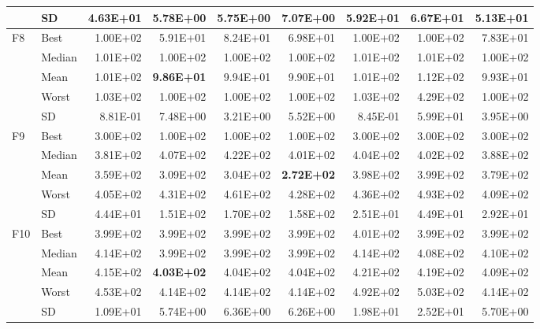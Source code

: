 \documentclass[10pt,a4paper]{article}
\newcommand{\bestval}[1]{\textbf{#1}}
\begin{document}
\begin{table}[p]
\begin{tabular}{llrrrrrrr}
 & SD & 4.63E+01 & 5.78E+00 & 5.75E+00 & 7.07E+00 & 5.92E+01 & 6.67E+01 & 5.13E+01 \\
\midrule
F8 & Best & 1.00E+02 & 5.91E+01 & 8.24E+01 & 6.98E+01 & 1.00E+02 & 1.00E+02 & 7.83E+01 \\
 & Median & 1.01E+02 & 1.00E+02 & 1.00E+02 & 1.00E+02 & 1.01E+02 & 1.01E+02 & 1.00E+02 \\
 & Mean & 1.01E+02 & \bestval{9.86E+01} & 9.94E+01 & 9.90E+01 & 1.01E+02 & 1.12E+02 & 9.93E+01 \\
 & Worst & 1.03E+02 & 1.00E+02 & 1.00E+02 & 1.00E+02 & 1.03E+02 & 4.29E+02 & 1.00E+02 \\
 & SD & 8.81E-01 & 7.48E+00 & 3.21E+00 & 5.52E+00 & 8.45E-01 & 5.99E+01 & 3.95E+00 \\
\midrule
F9 & Best & 3.00E+02 & 1.00E+02 & 1.00E+02 & 1.00E+02 & 3.00E+02 & 3.00E+02 & 3.00E+02 \\
 & Median & 3.81E+02 & 4.07E+02 & 4.22E+02 & 4.01E+02 & 4.04E+02 & 4.02E+02 & 3.88E+02 \\
 & Mean & 3.59E+02 & 3.09E+02 & 3.04E+02 & \bestval{2.72E+02} & 3.98E+02 & 3.99E+02 & 3.79E+02 \\
 & Worst & 4.05E+02 & 4.31E+02 & 4.61E+02 & 4.28E+02 & 4.36E+02 & 4.93E+02 & 4.09E+02 \\
 & SD & 4.44E+01 & 1.51E+02 & 1.70E+02 & 1.58E+02 & 2.51E+01 & 4.49E+01 & 2.92E+01 \\
\midrule
F10 & Best & 3.99E+02 & 3.99E+02 & 3.99E+02 & 3.99E+02 & 4.01E+02 & 3.99E+02 & 3.99E+02 \\
 & Median & 4.14E+02 & 3.99E+02 & 3.99E+02 & 3.99E+02 & 4.14E+02 & 4.08E+02 & 4.10E+02 \\
 & Mean & 4.15E+02 & \bestval{4.03E+02} & 4.04E+02 & 4.04E+02 & 4.21E+02 & 4.19E+02 & 4.09E+02 \\
 & Worst & 4.53E+02 & 4.14E+02 & 4.14E+02 & 4.14E+02 & 4.92E+02 & 5.03E+02 & 4.14E+02 \\
 & SD & 1.09E+01 & 5.74E+00 & 6.36E+00 & 6.26E+00 & 1.98E+01 & 2.52E+01 & 5.70E+00 \\
\bottomrule
\end{tabular}
\end{table}
\end{document}
